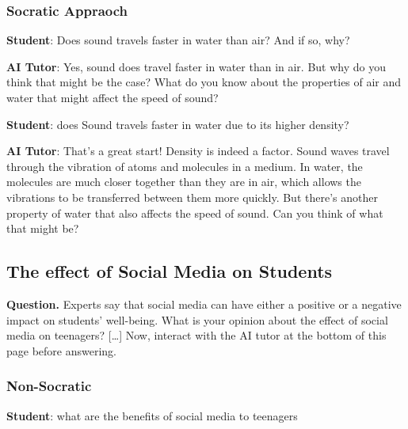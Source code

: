 \documentclass[
  11pt,
]{article}
\begin{document}
\subsubsection{Socratic Appraoch}\label{socratic-appraoch}

\textbf{Student}: Does sound travels faster in water than air? And if so, why?

\textbf{AI Tutor}: Yes, sound does travel faster in water than in air. But why do you think that might be the case? What do you know about the properties of air and water that might affect the speed of sound?

\textbf{Student}: does Sound travels faster in water due to its higher density?

\textbf{AI Tutor}: That's a great start! Density is indeed a factor. Sound waves travel through the vibration of atoms and molecules in a medium. In water, the molecules are much closer together than they are in air, which allows the vibrations to be transferred between them more quickly. But there's another property of water that also affects the speed of sound. Can you think of what that might be?

\subsection{The effect of Social Media on Students}\label{the-effect-of-social-media-on-students}

\textbf{Question.} Experts say that social media can have either a positive or a negative impact on students' well-being. What is your opinion about the effect of social media on teenagers? {[}\ldots{]} Now, interact with the AI tutor at the bottom of this page before answering.

\subsubsection{Non-Socratic}\label{non-socratic}

\textbf{Student}: what are the benefits of social media to teenagers
\end{document}
